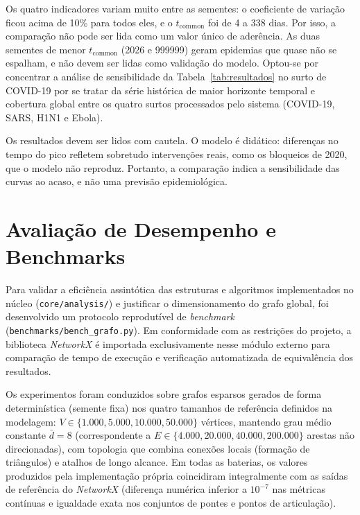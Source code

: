 \documentclass[11pt]{article}
\begin{document}
Os quatro indicadores variam muito entre as sementes: o coeficiente de variação ficou acima de 10\% para todos eles, e o $t_{\text{common}}$ foi de 4 a 338 dias. Por isso, a comparação não pode ser lida como um valor único de aderência. As duas sementes de menor $t_{\text{common}}$ (2026 e 999999) geram epidemias que quase não se espalham, e não devem ser lidas como validação do modelo. Optou-se por concentrar a análise de sensibilidade da Tabela~\ref{tab:resultados} no surto de COVID-19 por se tratar da série histórica de maior horizonte temporal e cobertura global entre os quatro surtos processados pelo sistema (COVID-19, SARS, H1N1 e Ebola).

Os resultados devem ser lidos com cautela. O modelo é didático: diferenças no tempo do pico refletem sobretudo intervenções reais, como os bloqueios de 2020, que o modelo não reproduz. Portanto, a comparação indica a sensibilidade das curvas ao acaso, e não uma previsão epidemiológica.

\section{Avaliação de Desempenho e Benchmarks} \label{sec:desempenho}

Para validar a eficiência assintótica das estruturas e algoritmos implementados no núcleo (\texttt{core/analysis/}) e justificar o dimensionamento do grafo global, foi desenvolvido um protocolo reprodutível de \emph{benchmark} (\texttt{benchmarks/bench\_grafo.py}). Em conformidade com as restrições do projeto, a biblioteca \emph{NetworkX} é importada exclusivamente nesse módulo externo para comparação de tempo de execução e verificação automatizada de equivalência dos resultados.

Os experimentos foram conduzidos sobre grafos esparsos gerados de forma determinística (semente fixa) nos quatro tamanhos de referência definidos na modelagem: $V \in \{1.000, 5.000, 10.000, 50.000\}$ vértices, mantendo grau médio constante $\bar{d} = 8$ (correspondente a $E \in \{4.000, 20.000, 40.000, 200.000\}$ arestas não direcionadas), com topologia que combina conexões locais (formação de triângulos) e atalhos de longo alcance. Em todas as baterias, os valores produzidos pela implementação própria coincidiram integralmente com as saídas de referência do \emph{NetworkX} (diferença numérica inferior a $10^{-7}$ nas métricas contínuas e igualdade exata nos conjuntos de pontes e pontos de articulação).
\end{document}

